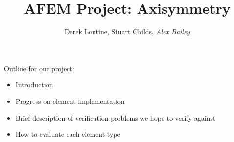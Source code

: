 \documentclass[10pt,letterpaper]{report}
\author{Derek Lontine, Stuart Childs, \it{Alex Bailey}}
\title{AFEM Project: Axisymmetry}
\begin{document}
\maketitle

Outline for our project:
\begin{itemize}
\item{Introduction}
\item{Progress on element implementation}
\item{Brief description of verification problems we hope to verify against}
\item{How to evaluate each element type}
\end{itemize}
\end{document}
